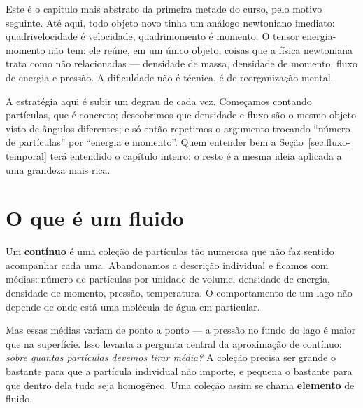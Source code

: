 \documentclass[12pt,a4paper,oneside]{book}
\theoremstyle{rgplain}
\theoremstyle{rgremark}
\begin{document}
\begin{leitura}
Este é o capítulo mais abstrato da primeira metade do curso, pelo motivo
seguinte. Até aqui, todo objeto novo tinha um análogo newtoniano imediato:
quadrivelocidade é velocidade, quadrimomento é momento. O tensor
energia-momento não tem: ele reúne, em um único objeto, coisas que a física
newtoniana trata como não relacionadas --- densidade de massa, densidade de
momento, fluxo de energia e pressão. A dificuldade não é técnica, é de
reorganização mental.

A estratégia aqui é subir um degrau de cada vez. Começamos contando
partículas, que é concreto; descobrimos que densidade e fluxo são o mesmo
objeto visto de ângulos diferentes; e só então repetimos o argumento
trocando ``número de partículas'' por ``energia e momento''. Quem entender
bem a Seção~\ref{sec:fluxo-temporal} terá entendido o capítulo inteiro: o
resto é a mesma ideia aplicada a uma grandeza mais rica.
\end{leitura}

\section{O que é um fluido}
\label{sec:o-que-e-fluido}

Um \textbf{contínuo} é uma coleção de partículas tão numerosa que não faz
sentido acompanhar cada uma. Abandonamos a descrição individual e ficamos com
médias: número de partículas por unidade de volume, densidade de energia,
densidade de momento, pressão, temperatura. O comportamento de um lago não
depende de onde está uma molécula de água em particular.

Mas essas médias variam de ponto a ponto --- a pressão no fundo do lago é
maior que na superfície. Isso levanta a pergunta central da aproximação de
contínuo: \emph{sobre quantas partículas devemos tirar média?} A coleção
precisa ser grande o bastante para que a partícula individual não importe, e
pequena o bastante para que dentro dela tudo seja homogêneo. Uma coleção
assim se chama \textbf{elemento} de fluido.
\end{document}

